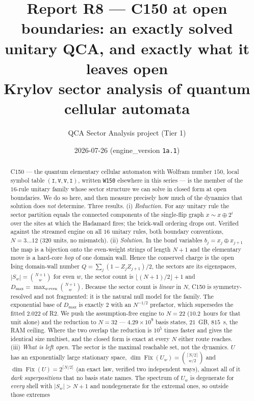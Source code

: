 \documentclass[11pt]{article}
\title{\textbf{Report R8 --- C150 at open boundaries: an exactly solved unitary
QCA, and exactly what it leaves open}\\
\large Krylov sector analysis of quantum cellular automata}
\author{QCA Sector Analysis project (Tier 1)}
\date{2026-07-26 \quad\small(engine\_version \texttt{1a.1})}
\newcommand{\rt}[1]{\texttt{#1}}
\newcommand{\Fix}{\operatorname{Fix}}
\theoremstyle{plain}
\theoremstyle{definition}
\begin{document}
\maketitle

\begin{abstract}
C150 --- the quantum elementary cellular automaton with Wolfram number $150$,
local symbol table $(\rt{I},\rt{V},\rt{V},\rt{I})$, written \rt{W150} elsewhere
in this series --- is the member of the $16$-rule unitary family whose sector
structure we can solve in closed form at open boundaries. We do so here, and
then measure precisely how much of the dynamics that solution does \emph{not}
determine. Three results. (i) \emph{Reduction.} For any unitary rule the sector
partition equals the connected components of the single-flip graph
$x \sim x\oplus 2^i$ over the sites at which the Hadamard fires; the brick-wall
ordering drops out. Verified against the streamed engine on all $16$ unitary
rules, both boundary conventions, $N=3\ldots12$ ($320$ units, no mismatch).
(ii) \emph{Solution.} In the bond variables $b_j = x_j \oplus x_{j+1}$ the map is
a bijection onto the even-weight strings of length $N+1$ and the elementary move
is a hard-core \emph{hop} of one domain wall. Hence the conserved charge is the
open Ising domain-wall number $Q=\sum_j (1-Z_jZ_{j+1})/2$, the sectors are its
eigenspaces, $|S_w| = \binom{N+1}{w}$ for even $w$, the sector count is
$\lfloor (N{+}1)/2\rfloor + 1$ and $D_{\max} = \max_{w\,\mathrm{even}}
\binom{N+1}{w}$. Because the sector count is \emph{linear} in $N$, C150 is
symmetry-resolved and not fragmented: it is the natural null model for the
family. The exponential base of $D_{\max}$ is exactly $2$ with an $N^{-1/2}$
prefactor, which supersedes the fitted $2.022$ of R2. We push the
assumption-free engine to $N=22$ ($10.2$~hours for that unit alone) and the
reduction to $N=32$ --- $4.29\times10^{9}$ basis states, $21$~GB, $815$~s, the
RAM ceiling. Where the two overlap the reduction is $10^{5}$ times faster and
gives the identical size multiset, and the closed form is exact at every $N$
either route reaches.
(iii) \emph{What is left open.} The sector is the maximal reachable set, not the
dynamics. $U$ has an exponentially large stationary space,
$\dim\Fix(U_w)=\binom{\lceil N/2\rceil}{w/2}$ and
$\dim\Fix(U)=2^{\lceil N/2\rceil}$ (an exact law, verified two independent
ways), almost all of it \emph{dark superpositions} that no basis state names. The
spectrum of $U_w$ is degenerate for \emph{every} shell with $|S_w|>N+1$ and
nondegenerate for the extremal ones, so outside those extremes

\end{abstract}
\end{document}
